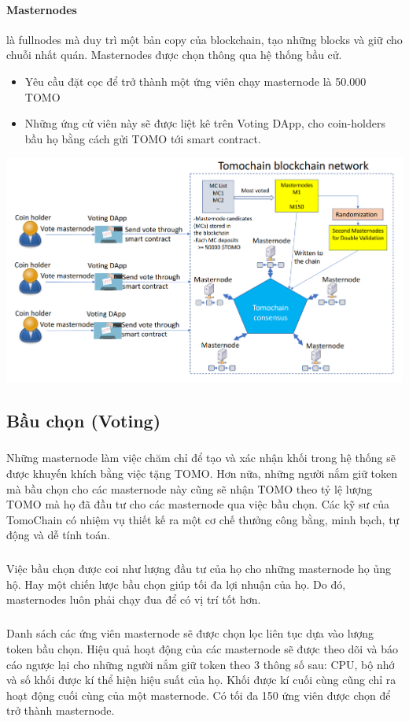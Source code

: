 \documentclass[12pt,a4paper]{article}
\begin{document}
		\paragraph{Masternodes}
		là fullnodes mà duy trì một bản copy của blockchain, tạo những blocks và giữ cho chuỗi nhất quán.
		Masternodes được chọn thông qua hệ thống bầu cử. 
		\begin{itemize}		
			\item Yêu cầu đặt cọc để trở thành một ứng viên chạy masternode là 50.000 TOMO
			\item Những ứng cử viên này sẽ được liệt kê trên Voting DApp, cho coin-holders bầu họ bằng cách gửi TOMO tới smart contract.
		\end{itemize}
		\includegraphics[width=\linewidth]{tomoarchitec.png} \\
	\subsection{Bầu chọn (Voting)}		
		\subparagraph{} Những masternode làm việc chăm chỉ để tạo và xác nhận khối trong hệ thống sẽ được khuyến khích bằng việc tặng TOMO. Hơn nữa, những người nắm giữ token mà bầu chọn cho các masternode này cũng sẽ nhận TOMO theo tỷ lệ lượng TOMO mà họ đã đầu tư cho các masternode qua việc bầu chọn. Các kỹ sư của TomoChain có nhiệm vụ thiết kế ra một cơ chế thưởng công bằng, minh bạch, tự động và dễ tính toán. 
		\subparagraph{} Việc bầu chọn được coi như lượng đầu tư của họ cho những masternode họ ủng hộ. Hay một chiến lược bầu chọn giúp tối đa lợi nhuận của họ. Do đó, masternodes luôn phải chạy đua để có vị trí tốt hơn.
		\subparagraph{} Danh sách các ứng viên masternode sẽ được chọn lọc liên tục dựa vào lượng token bầu chọn. Hiệu quả hoạt động của các masternode sẽ được theo dõi và báo cáo ngược lại cho những người nắm giữ token theo 3 thông số sau: CPU, bộ nhớ và số khối được kí thể hiện hiệu suất của họ. Khối được kí cuối cùng cũng chỉ ra hoạt động cuối cùng của một masternode. Có tối đa 150 ứng viên được chọn để trở thành masternode.
\end{document}
